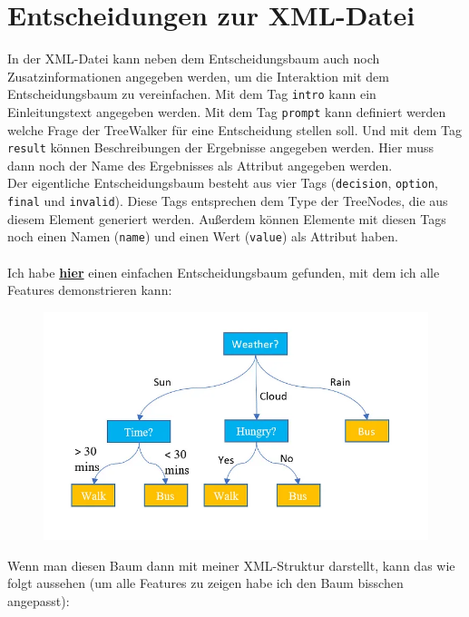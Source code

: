 \documentclass[a4paper,12pt]{article}
\begin{document}
\section*{Entscheidungen zur XML-Datei}
In der XML-Datei kann neben dem Entscheidungsbaum auch noch Zusatzinformationen angegeben werden, um die Interaktion mit dem Entscheidungsbaum zu vereinfachen. 
Mit dem Tag \texttt{intro} kann ein Einleitungstext angegeben werden. 
Mit dem Tag \texttt{prompt} kann definiert werden welche Frage der TreeWalker für eine Entscheidung stellen soll.
Und mit dem Tag \texttt{result} können Beschreibungen der Ergebnisse angegeben werden. Hier muss dann noch der Name des Ergebnisses als Attribut angegeben werden.
\\
Der eigentliche Entscheidungsbaum besteht aus vier Tags (\texttt{decision}, \texttt{option}, \texttt{final} und \texttt{invalid}). 
Diese Tags entsprechen dem Type der TreeNodes, die aus diesem Element generiert werden.
Außerdem können Elemente mit diesen Tags noch einen Namen (\texttt{name}) und einen Wert (\texttt{value}) als Attribut haben.
\\
\\
Ich habe \href{https://heartbeat.comet.ml/understanding-the-mathematics-behind-decision-trees-22d86d55906}{\textbf{hier}} einen einfachen Entscheidungsbaum gefunden, mit dem ich alle Features demonstrieren kann:

\begin{figure}[h]
	\centering
	\includegraphics[width=\linewidth]{tree.png}
\end{figure}

Wenn man diesen Baum dann mit meiner XML-Struktur darstellt, kann das wie folgt aussehen (um alle Features zu zeigen habe ich den Baum bisschen angepasst):
\end{document}

